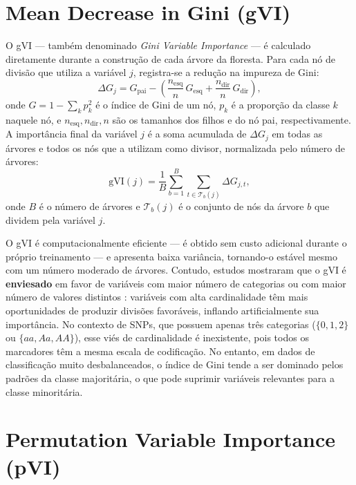 \documentclass[
    12pt,
    a4paper,
    oneside,
    english,
    french,
    spanish,
    brazil
    ]{abntex2}
\newcommand{\novo}[1]{\textcolor{corNova}{#1}}
\begin{document}
\section*{Mean Decrease in Gini (gVI)}

\novo{O gVI --- também denominado \textit{Gini Variable Importance} --- é calculado diretamente durante a construção de cada árvore da floresta. Para cada nó de divisão que utiliza a variável $j$, registra-se a redução na impureza de Gini:
\begin{equation}
  \Delta G_j = G_{\text{pai}} - \left(\frac{n_{\text{esq}}}{n}\,G_{\text{esq}} + \frac{n_{\text{dir}}}{n}\,G_{\text{dir}}\right),
\end{equation}
onde $G = 1 - \sum_k p_k^2$ é o índice de Gini de um nó, $p_k$ é a proporção da classe $k$ naquele nó, e $n_{\text{esq}}, n_{\text{dir}}, n$ são os tamanhos dos filhos e do nó pai, respectivamente. A importância final da variável $j$ é a soma acumulada de $\Delta G_j$ em todas as árvores e todos os nós que a utilizam como divisor, normalizada pelo número de árvores:
\begin{equation}
  \mathrm{gVI}(j) = \frac{1}{B} \sum_{b=1}^{B} \sum_{t \in \mathcal{T}_b(j)} \Delta G_{j,t},
\end{equation}
onde $B$ é o número de árvores e $\mathcal{T}_b(j)$ é o conjunto de nós da árvore $b$ que dividem pela variável $j$.}

\novo{O gVI é computacionalmente eficiente --- é obtido sem custo adicional durante o próprio treinamento --- e apresenta baixa variância, tornando-o estável mesmo com um número moderado de árvores. Contudo, estudos mostraram que o gVI é \textbf{enviesado} em favor de variáveis com maior número de categorias ou com maior número de valores distintos \cite{strobl2007bias}: variáveis com alta cardinalidade têm mais oportunidades de produzir divisões favoráveis, inflando artificialmente sua importância. No contexto de SNPs, que possuem apenas três categorias ($\{0, 1, 2\}$ ou $\{aa, Aa, AA\}$), esse viés de cardinalidade é inexistente, pois todos os marcadores têm a mesma escala de codificação. No entanto, em dados de classificação muito desbalanceados, o índice de Gini tende a ser dominado pelos padrões da classe majoritária, o que pode suprimir variáveis relevantes para a classe minoritária.}

\section*{Permutation Variable Importance (pVI)}
\end{document}
